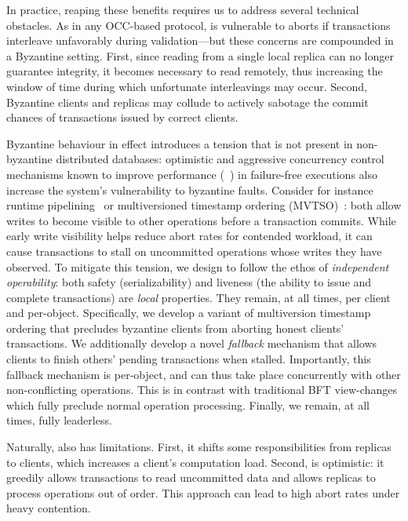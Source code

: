 In practice, reaping these benefits requires us to address several
technical obstacles. As in any OCC-based protocol, \sys
is vulnerable to aborts if transactions interleave unfavorably during
validation---but these concerns are compounded in a Byzantine
setting. First, since reading from a single local replica can no
longer guarantee integrity, it becomes necessary to read remotely,
thus increasing the window of time during which unfortunate
interleavings may occur. Second, Byzantine clients and replicas may
collude to actively sabotage the commit chances of transactions issued
by correct clients. 

Byzantine behaviour in effect introduces a tension that is not present in non-byzantine
distributed databases: optimistic and aggressive concurrency control mechanisms known
to improve performance (~\cite{occ,mvtso,pipeline,tapir}) in failure-free executions also increase the system's vulnerability to byzantine faults. Consider for instance runtime pipelining~\cite{callas,mcc} or multiversioned timestamp ordering (MVTSO)~\cite{}: both allow writes to become visible to other operations before a transaction commits. While early write visibility helps reduce abort rates for
contended workload, it can cause transactions to stall on uncommitted operations whose writes they have observed. To mitigate this tension, we design \sys{} to follow the ethos of \textit{independent operability}: both safety (serializability) and liveness (the ability to issue and complete transactions) are \textit{local} properties. They remain, at all times, per client and per-object. Specifically, we develop a variant of multiversion timestamp ordering that precludes byzantine clients from
aborting honest clients' transactions. We additionally develop a novel \textit{fallback} mechanism that allows clients to finish others' pending transactions when stalled. Importantly, this fallback mechanism is per-object, and can thus take place concurrently with other non-conflicting operations. This is in contrast with traditional BFT view-changes which fully preclude normal operation processing.  Finally, we remain, at all times, fully leaderless.

Naturally, \sys{} also has limitations. First, it shifts some
responsibilities from replicas to clients, which increases a client's computation load. Second, \sys{} is optimistic: it greedily allows transactions to read uncommitted data and allows replicas to process operations out of order. This approach can lead to high abort rates under heavy contention.

